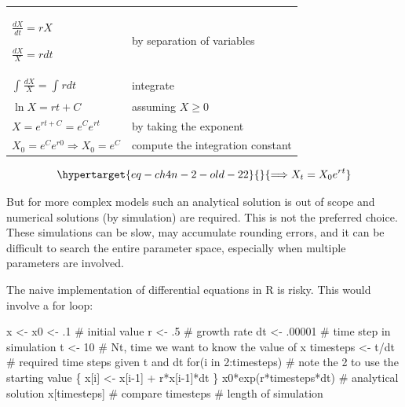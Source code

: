 \documentclass[
  a4paper,
  DIV=11,
  numbers=noendperiod]{scrreprt}
\newenvironment{Shaded}{\begin{snugshade}}{\end{snugshade}}
\newcommand{\CommentTok}[1]{\textcolor[rgb]{0.37,0.37,0.37}{#1}}
\newcommand{\ControlFlowTok}[1]{\textcolor[rgb]{0.00,0.23,0.31}{#1}}
\newcommand{\DecValTok}[1]{\textcolor[rgb]{0.68,0.00,0.00}{#1}}
\newcommand{\FunctionTok}[1]{\textcolor[rgb]{0.28,0.35,0.67}{#1}}
\newcommand{\NormalTok}[1]{\textcolor[rgb]{0.00,0.23,0.31}{#1}}
\newcommand{\OtherTok}[1]{\textcolor[rgb]{0.00,0.23,0.31}{#1}}
\newcommand{\SpecialCharTok}[1]{\textcolor[rgb]{0.37,0.37,0.37}{#1}}
\begin{document}
\begin{longtable}[]{@{}
  >{\raggedright\arraybackslash}p{}
  >{\raggedright\arraybackslash}p{}@{}}
\toprule\noalign{}
\endhead
\bottomrule\noalign{}
\endlastfoot
\(\frac{dX}{dt} = rX\)

\(\frac{dX}{X} = rdt\) & by separation of variables \\
\(\int_{}^{}\frac{dX}{X} = \int_{}^{}{rdt}\) & integrate \\
\(\ln X = rt + C\) & assuming \(X \geq 0\) \\
\(X = e^{rt + C} = e^{C}e^{rt}\) & by taking the exponent \\
\(X_{0} = e^{C}e^{r0} \Longrightarrow X_{0} = e^{C}\) & compute the
integration constant \\
\end{longtable}

\begin{equation}\protect\hypertarget{eq-ch4n-2-old-22}{}{
\Longrightarrow X_{t} = {X_{0}e}^{rt}
}\label{eq-ch4n-2-old-22}\end{equation}

But for more complex models such an analytical solution is out of scope
and numerical solutions (by simulation) are required. This is not the
preferred choice. These simulations can be slow, may accumulate rounding
errors, and it can be difficult to search the entire parameter space,
especially when multiple parameters are involved.

The naive implementation of differential equations in R is risky. This
would involve a for loop:

\begin{Shaded}
\begin{Highlighting}[]
\NormalTok{x }\OtherTok{\textless{}{-}}\NormalTok{ x0 }\OtherTok{\textless{}{-}}\NormalTok{ .}\DecValTok{1}  \CommentTok{\# initial value}
\NormalTok{r }\OtherTok{\textless{}{-}}\NormalTok{ .}\DecValTok{5} \CommentTok{\# growth rate}
\NormalTok{dt }\OtherTok{\textless{}{-}}\NormalTok{ .}\DecValTok{00001} \CommentTok{\# time step in simulation}
\NormalTok{t }\OtherTok{\textless{}{-}} \DecValTok{10}  \CommentTok{\# Nt, time we want to know the value of x}
\NormalTok{timesteps }\OtherTok{\textless{}{-}}\NormalTok{ t}\SpecialCharTok{/}\NormalTok{dt }\CommentTok{\# required time steps given t and dt}
\ControlFlowTok{for}\NormalTok{(i }\ControlFlowTok{in} \DecValTok{2}\SpecialCharTok{:}\NormalTok{timesteps) }\CommentTok{\# note the 2 to use the starting value}
\NormalTok{\{}
\NormalTok{  x[i] }\OtherTok{\textless{}{-}}\NormalTok{ x[i}\DecValTok{{-}1}\NormalTok{] }\SpecialCharTok{+}\NormalTok{ r}\SpecialCharTok{*}\NormalTok{x[i}\DecValTok{{-}1}\NormalTok{]}\SpecialCharTok{*}\NormalTok{dt}
\NormalTok{\}}
\NormalTok{x0}\SpecialCharTok{*}\FunctionTok{exp}\NormalTok{(r}\SpecialCharTok{*}\NormalTok{timesteps}\SpecialCharTok{*}\NormalTok{dt) }\CommentTok{\# analytical solution}
\NormalTok{x[timesteps] }\CommentTok{\# compare}
\NormalTok{timesteps }\CommentTok{\# length of simulation}
\end{Highlighting}
\end{Shaded}
\end{document}
